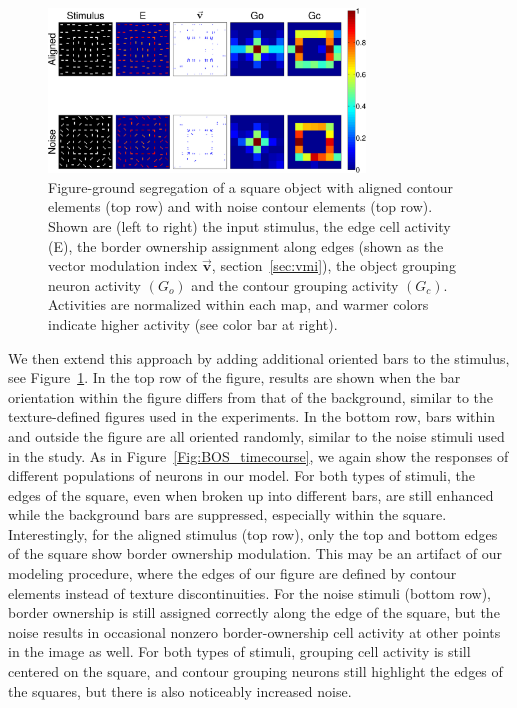 \begin{figure}[t!]
\centering
\includegraphics[width=0.75\textwidth]{Contour/figs/Fig7.eps}
\makeatletter
\let\@currsize\normalsize
\caption[Figure-ground segregation in the presence of noise]{Figure-ground segregation of a square object with aligned contour elements (top row) and with noise contour elements (top row). Shown are (left to right) the input stimulus, the edge cell activity (E), the border ownership assignment along edges (shown as the vector modulation index  $\overrightarrow{\mathbf{v}}$, section~\ref{sec:vmi}), the object grouping  neuron activity $(G_o)$ and the contour grouping activity $(G_c)$. Activities are normalized within each map, and warmer colors indicate higher activity (see color bar at right).}
\label{Fig:Square_Noise}
\end{figure}

We then extend this approach by adding additional oriented bars to the
stimulus, see Figure~\ref{Fig:Square_Noise}. In the top row of the figure, results are shown when the bar orientation within the figure differs from that of the background, similar to the texture-defined figures used in the \citet{Lamme95} experiments. In the bottom row, bars within and outside the figure are all oriented randomly, similar to the noise stimuli used in the \citet{Chen_etal14} study.  As in
Figure~\ref{Fig:BOS_timecourse}, we again show the responses of
different populations of neurons in our model.  For both types of
stimuli, the edges of the square, even when broken up into different
bars, are still enhanced while the background bars are suppressed,
especially within the square.  Interestingly, for the aligned stimulus
(top row), only the top and bottom edges of the square show border
ownership modulation. This may be an artifact of our modeling
procedure, where the edges of our figure are defined by contour elements instead of texture discontinuities. For the noise stimuli (bottom row), border ownership is still assigned correctly along the edge of the square, but the noise results in occasional nonzero border-ownership cell activity at other points in the image as well.  For both types of stimuli, grouping cell activity is still centered on the square, and contour grouping neurons still highlight the edges of the squares, but there is also noticeably increased noise.

